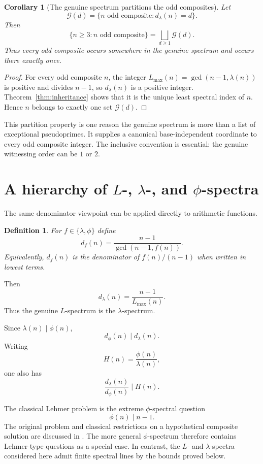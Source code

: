 \documentclass[11pt]{article}
\newtheorem{corollary}[theorem]{Corollary}
\newtheorem{definition}[theorem]{Definition}
\begin{document}
\begin{corollary}[The genuine spectrum partitions the odd composites]
\label{cor:genuine-partition}
Let
\[
\mathcal G(d)=\{n\text{ odd composite}:d_\lambda(n)=d\}.
\]
Then
\[
\boxed{
\{n\ge3:n\text{ odd composite}\}
=\bigsqcup_{d\ge1}\mathcal G(d).
}
\]
Thus every odd composite occurs somewhere in the genuine spectrum and occurs
there exactly once.
\end{corollary}

\begin{proof}
For every odd composite $n$, the integer $L_{\max}(n)=\gcd(n-1,\lambda(n))$
is positive and divides $n-1$, so $d_\lambda(n)$ is a positive integer.
Theorem~\ref{thm:inheritance} shows that it is the unique least spectral index
of $n$.  Hence $n$ belongs to exactly one set $\mathcal G(d)$.
\end{proof}

This partition property is one reason the genuine spectrum is more than a
list of exceptional pseudoprimes.  It supplies a canonical base-independent
coordinate to every odd composite integer.  The inclusive convention is
essential: the genuine witnessing order can be $1$ or $2$.

\section{A hierarchy of $L$-, $\lambda$-, and $\phi$-spectra}

The same denominator viewpoint can be applied directly to arithmetic
functions.

\begin{definition}
For $f\in\{\lambda,\phi\}$ define
\[
d_f(n)=\frac{n-1}{\gcd(n-1,f(n))}.
\]
Equivalently, $d_f(n)$ is the denominator of
$f(n)/(n-1)$ when written in lowest terms.
\end{definition}

Then
\[
d_\lambda(n)=\frac{n-1}{L_{\max}(n)}.
\]
Thus the genuine $L$-spectrum is the $\lambda$-spectrum.

Since $\lambda(n)\mid\phi(n)$,
\[
d_\phi(n)\mid d_\lambda(n).
\]
Writing
\[
H(n)=\frac{\phi(n)}{\lambda(n)},
\]
one also has
\[
\frac{d_\lambda(n)}{d_\phi(n)}\mid H(n).
\]

The classical Lehmer problem is the extreme $\phi$-spectral question
\[
\phi(n)\mid n-1.
\]
The original problem and classical restrictions on a hypothetical composite
solution are discussed in \cite{Lehmer1932,Pomerance1977}.  The more general
$\phi$-spectrum therefore contains Lehmer-type
questions as a special case.  In contrast, the $L$- and
$\lambda$-spectra considered here admit finite spectral lines by the
bounds proved below.
\end{document}

